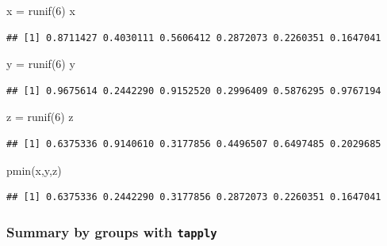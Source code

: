 \documentclass[
]{book}
\newenvironment{Shaded}{\begin{snugshade}}{\end{snugshade}}
\newcommand{\DecValTok}[1]{\textcolor[rgb]{0.00,0.00,0.81}{#1}}
\newcommand{\FunctionTok}[1]{\textcolor[rgb]{0.00,0.00,0.00}{#1}}
\newcommand{\NormalTok}[1]{#1}
\newcommand{\OtherTok}[1]{\textcolor[rgb]{0.56,0.35,0.01}{#1}}
\theoremstyle{definition}
\theoremstyle{definition}
\theoremstyle{definition}
\theoremstyle{definition}
\theoremstyle{remark}
\begin{document}
\begin{Shaded}
\begin{Highlighting}[]
\NormalTok{x }\OtherTok{=} \FunctionTok{runif}\NormalTok{(}\DecValTok{6}\NormalTok{)}
\NormalTok{x}
\end{Highlighting}
\end{Shaded}

\begin{verbatim}
## [1] 0.8711427 0.4030111 0.5606412 0.2872073 0.2260351 0.1647041
\end{verbatim}

\begin{Shaded}
\begin{Highlighting}[]
\NormalTok{y }\OtherTok{=} \FunctionTok{runif}\NormalTok{(}\DecValTok{6}\NormalTok{)}
\NormalTok{y}
\end{Highlighting}
\end{Shaded}

\begin{verbatim}
## [1] 0.9675614 0.2442290 0.9152520 0.2996409 0.5876295 0.9767194
\end{verbatim}

\begin{Shaded}
\begin{Highlighting}[]
\NormalTok{z }\OtherTok{=} \FunctionTok{runif}\NormalTok{(}\DecValTok{6}\NormalTok{)}
\NormalTok{z}
\end{Highlighting}
\end{Shaded}

\begin{verbatim}
## [1] 0.6375336 0.9140610 0.3177856 0.4496507 0.6497485 0.2029685
\end{verbatim}

\begin{Shaded}
\begin{Highlighting}[]
\FunctionTok{pmin}\NormalTok{(x,y,z)}
\end{Highlighting}
\end{Shaded}

\begin{verbatim}
## [1] 0.6375336 0.2442290 0.3177856 0.2872073 0.2260351 0.1647041
\end{verbatim}

\hypertarget{summary-by-groups-with-tapply}{%
\subsubsection{\texorpdfstring{Summary by groups with \texttt{tapply}}{Summary by groups with tapply}}\label{summary-by-groups-with-tapply}}
\end{document}
